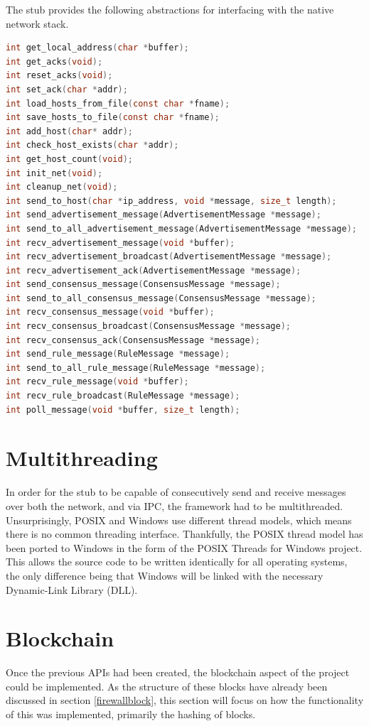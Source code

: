 \documentclass[a4paper, 11pt]{report}
\begin{document}
The \gls{stub} provides the following abstractions for interfacing with the native network stack.
\begin{lstlisting}[language=c,style=c,caption=Network API]
int get_local_address(char *buffer);
int get_acks(void);
int reset_acks(void);
int set_ack(char *addr);
int load_hosts_from_file(const char *fname);
int save_hosts_to_file(const char *fname);
int add_host(char* addr);
int check_host_exists(char *addr);
int get_host_count(void);
int init_net(void);
int cleanup_net(void);
int send_to_host(char *ip_address, void *message, size_t length);
int send_advertisement_message(AdvertisementMessage *message);
int send_to_all_advertisement_message(AdvertisementMessage *message);
int recv_advertisement_message(void *buffer);
int recv_advertisement_broadcast(AdvertisementMessage *message);
int recv_advertisement_ack(AdvertisementMessage *message);
int send_consensus_message(ConsensusMessage *message);
int send_to_all_consensus_message(ConsensusMessage *message);
int recv_consensus_message(void *buffer);
int recv_consensus_broadcast(ConsensusMessage *message);
int recv_consensus_ack(ConsensusMessage *message);
int send_rule_message(RuleMessage *message);
int send_to_all_rule_message(RuleMessage *message);
int recv_rule_message(void *buffer);
int recv_rule_broadcast(RuleMessage *message);
int poll_message(void *buffer, size_t length);
\end{lstlisting}

\section{Multithreading}
In order for the \gls{stub} to be capable of consecutively send and receive messages over both the network, and via \acrshort{IPC}, the framework had to be multithreaded. Unsurprisingly, \acrshort{POSIX} and Windows use different thread models, which means there is no common threading interface. Thankfully, the \acrshort{POSIX} thread model has been ported to Windows in the form of the \acrshort{POSIX} Threads for Windows project\cite{pthread}. This allows the source code to be written identically for all operating systems, the only difference being that Windows will be linked with the necessary Dynamic-Link Library (DLL).

\section{Blockchain}
Once the previous \acrshort{API}s had been created, the \gls{blockchain} aspect of the project could be implemented. As the structure of these blocks have already been discussed in section \ref{firewallblock}, this section will focus on how the functionality of this was implemented, primarily the hashing of blocks.
\end{document}
